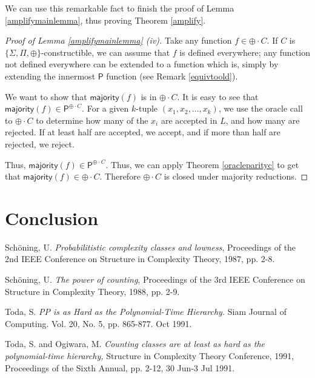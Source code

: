 \documentclass[11pt]{article}
\newcommand{\parity}{\oplus}
\newcommand{\p}{\textsf{P}}
\newcommand{\majority}{\textsf{majority}}
\begin{document}
We can use this remarkable fact to finish the proof of Lemma \ref{amplifymainlemma}, thus proving Theorem \ref{amplify}.
\begin{proof}[Proof of Lemma \ref{amplifymainlemma} (iv)]
Take any function $f \in \parity \cdot C$. If $C$ is $\{\Sigma, \Pi, \parity\}$-constructible, we can assume that $f$ is defined everywhere; any function not defined everywhere can be extended to a function which is, simply by extending the innermost $\p$ function (see Remark \ref{equivtoold}).

We want to show that $\majority(f)$ is in $\parity \cdot C$. It is easy to see that $\majority(f) \in \p^{\parity \cdot C}$. For a given $k$-tuple $(x_1,x_2,...,x_k)$, we use the oracle call to $\parity \cdot C$ to determine how many of the $x_i$ are accepted in $L$, and how many are rejected. If at least half are accepted, we accept, and if more than half are rejected, we reject.

Thus, $\majority(f) \in \p^{\parity \cdot C}$. Thus, we can apply Theorem \ref{oracleparityc} to get that $\majority(f) \in \parity \cdot C$. Therefore $\parity \cdot C$ is closed under majority reductions.
\end{proof}

\section{Conclusion}

\pagebreak

\begin{thebibliography}{9}


 Sch\"oning, U. \emph{Probabilitistic complexity classes and lowness}, Proceedings of the 2nd IEEE Conference on Structure in Complexity Theory, 1987, pp. 2-8.

 Sch\"oning, U. \emph{The power of counting}, Proceedings of the 3rd IEEE Conference on Structure in Complexity Theory, 1988, pp. 2-9.

Toda, S. \emph{PP is as Hard as the Polynomial-Time Hierarchy.} Siam Journal of Computing. Vol. 20, No. 5, pp. 865-877. Oct 1991.

 Toda, S. and Ogiwara, M. \emph{Counting classes are at least as hard as the polynomial-time hierarchy,} Structure in Complexity Theory Conference, 1991, Proceedings of the Sixth Annual, pp. 2-12, 30 Jun-3 Jul 1991.

\end{thebibliography}
\end{document}
